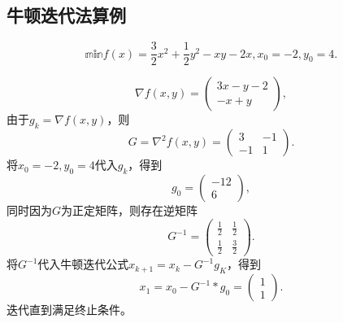 \subsection{牛顿迭代法算例}
\begin{example}
    \begin{equation}
        \mathbb{min}f(x)=\frac{3}{2}x^2+\frac{1}{2}y^2-xy-2x,
        x_0 = -2, y_0 = 4.
        \nonumber
    \end{equation}
\end{example}
\begin{solution}
    \begin{equation}
        \nabla f(x,y) = 
        \begin{pmatrix}
            3x-y-2 \\
            -x+y  
        \end{pmatrix},
    \nonumber
    \end{equation}
    由于$g_k=\nabla f(x,y)$，则
    \begin{equation}
    G = \nabla^2f(x,y) = 
        \begin{pmatrix}
            3 & -1\\
            -1 & 1   
        \end{pmatrix}.
    \nonumber
    \end{equation}
    将$x_0=-2,y_0=4$代入$g_k$，得到
    \begin{equation*}    
        g_0=
        \begin{pmatrix}
            -12\\
            6
        \end{pmatrix},
    \end{equation*}
    同时因为$G$为正定矩阵，则存在逆矩阵
    \begin{equation}
        G^{-1} = 
        \begin{pmatrix}
            \frac{1}{2} & \frac{1}{2} \\ 
            \frac{1}{2} & \frac{3}{2}
        \end{pmatrix}.
    \nonumber
    \end{equation}
    将$G^{-1}$代入牛顿迭代公式$x_{k+1} = x_k - G^{-1}g_K$，得到
    \begin{equation}
        x_1 = x_0 - G^{-1}*g_0 = 
        \begin{pmatrix}
            1 \\
            1
        \end{pmatrix}.
    \nonumber
    \end{equation}
    迭代直到满足终止条件。
\end{solution}


